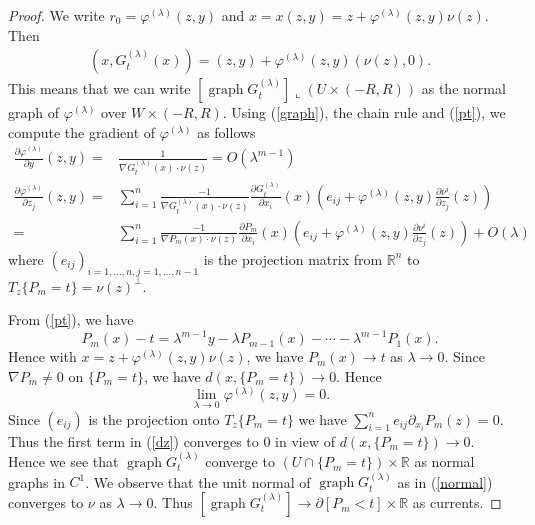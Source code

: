 \documentclass[10pt,a4paper]{amsart}
\newcommand{\R}{\mathbb{R}}
\DeclareMathOperator{\graph}{graph}
\newcommand{\vp}{\varphi}
\begin{document}
\begin{proof}
We write $r_0=\vp^{(\lambda)}(z,y)$ and $x=x(z,y)=z+\vp^{(\lambda)}(z,y)\nu(z)$. Then
\begin{align}\label{graph}
	(x,G_t^{(\lambda)}(x))=(z,y)+\vp^{(\lambda)}(z,y)(\nu(z),0).
\end{align}
This means that we can write $\left[\graph G_t^{(\lambda)}\right]\llcorner (U\times(-R,R))$ as the normal graph of $\vp^{(\lambda)}$ over $W \times (-R,R)$. Using (\ref{graph}), the chain rule and (\ref{pt}), we compute the gradient of $\vp^{(\lambda)}$ as follows 
\begin{align}
	\frac{\partial \vp^{(\lambda)}}{\partial y}(z,y)=&\frac{1}{\nabla G_t^{(\lambda)}(x)\cdot\nu(z)}=O(\lambda ^{m-1})\\
	\frac{\partial \vp^{(\lambda)}}{\partial z_j}(z,y)=&\sum_{i=1}^{n}\frac{-1}{\nabla G_t^{(\lambda)}(x)\cdot\nu(z)}\frac{\partial G_t^{(\lambda)}}{\partial x_i}(x)(e_{ij}+\vp^{(\lambda)}(z,y)\frac{\partial \nu^i}{\partial z_j}(z))\\
	=&\sum_{i=1}^{n}\frac{-1}{\nabla P_m(x)\cdot\nu(z)}\frac{\partial P_m}{\partial x_i}(x)(e_{ij}+\vp^{(\lambda)}(z,y)\frac{\partial \nu^i}{\partial z_j}(z))+O(\lambda)\label{dz}
\end{align}
where  $(e_{ij})_{i=1,\dots,n,j=1,\dots,n-1}$ is the projection matrix from $\R^n$ to $T_z\{P_m=t\}=\nu(z)^{\perp}$.

From (\ref{pt}), we have 
\begin{equation}\label{defining.vp}
	P_m(x)-t=\lambda^{m-1}y-\lambda P_{m-1}(x)-\cdots- \lambda^{m-1}P_1(x).
\end{equation} Hence  with $x=z+\vp^{(\lambda)}(z,y)\nu(z)$, we have $P_m(x)\to t$ as $\lambda\to0$. Since $\nabla P_m\neq0$ on $\{P_m=t\}$, we have $d(x,\{P_m=t\})\to 0$. Hence\[\lim_{\lambda\to 0}\vp^{(\lambda)}(z,y)= 0.\]
Since $(e_{ij})$ is the projection onto $T_z\{P_m=t\}$ we have $\sum_{i=1}^{n}e_{ij}\partial_{x_i}P_m(z)=0$. Thus the first term in (\ref{dz}) converges to 0 in view of $d(x,\{P_m=t\})\to 0$. Hence we see that $\graph G_t^{(\lambda)}$ converge to $(U\cap \{P_m=t\})\times\R$ as normal graphs in $C^1$. We observe that the unit normal of $\graph G_t^{(\lambda)}$ as in (\ref{normal}) converges to $\nu$ as $\lambda\to0$. Thus $\left[\graph G_t^{(\lambda)}\right]\to \partial[P_m<t]\times \R$ as currents.


\end{proof}
\end{document}

